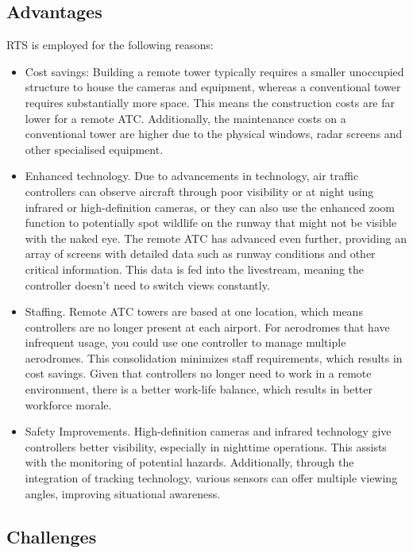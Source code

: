\subsection{Advantages}
\gls{RTS} is employed for the following reasons:
\begin{itemize}
    \item Cost savings: Building a remote tower typically requires a smaller unoccupied structure to house the cameras and equipment, whereas a conventional tower requires substantially more space. This means the construction costs are far lower for a remote ATC. Additionally, the maintenance costs on a conventional tower are higher due to the physical windows, radar screens and other specialised equipment.
    \item Enhanced technology. Due to advancements in technology, air traffic controllers can observe aircraft through poor visibility or at night using infrared or high-definition cameras, or they can also use the enhanced zoom function to potentially spot wildlife on the runway that might not be visible with the naked eye. The remote ATC has advanced even further, providing an array of screens with detailed data such as runway conditions and other critical information. This data is fed into the livestream, meaning the controller doesn’t need to switch views constantly.
    \item Staffing. Remote ATC towers are based at one location, which means controllers are no longer present at each airport. For aerodromes that have infrequent usage, you could use one controller to manage multiple aerodromes. This consolidation minimizes staff requirements, which results in cost savings. Given that controllers no longer need to work in a remote environment, there is a better work-life balance, which results in better workforce morale.
    \item Safety Improvements. High-definition cameras and infrared technology give controllers better visibility, especially in nighttime operations. This assists with the monitoring of potential hazards. Additionally, through the integration of tracking technology, various sensors can offer multiple viewing angles, improving situational awareness.
\end{itemize}



\subsection{Challenges}

